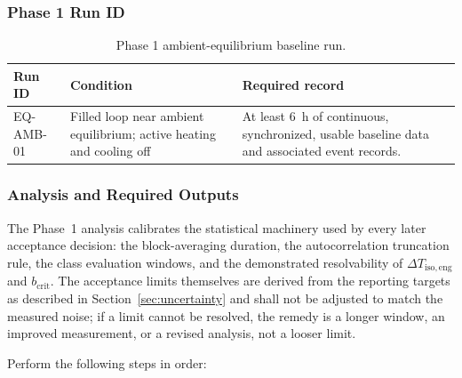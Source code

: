 \documentclass[11pt]{article}
\begin{document}
\subsubsection{Phase 1 Run ID}

\begin{table}[htbp]
    \centering
    \caption{Phase 1 ambient-equilibrium baseline run.}
    \label{tab:phase1_runs}
    \begin{tabularx}{\textwidth}{
        @{}
        >{\raggedright\arraybackslash}p{1.20in}
        >{\raggedright\arraybackslash}p{1.85in}
        >{\raggedright\arraybackslash}X
        @{}
    }
        \toprule
        \textbf{Run ID} &
        \textbf{Condition} &
        \textbf{Required record} \\
        \midrule

        EQ-AMB-01 &
        Filled loop near ambient equilibrium; active heating and cooling off &
        At least \SI{6}{h} of continuous, synchronized, usable baseline data and associated event records. \\

        \bottomrule
    \end{tabularx}
\end{table}

\subsubsection{Analysis and Required Outputs}

The Phase~1 analysis calibrates the statistical machinery used by every later acceptance decision: the block-averaging duration, the autocorrelation truncation rule, the class evaluation windows, and the demonstrated resolvability of $\Delta T_{\mathrm{iso,eng}}$ and $b_{\mathrm{crit}}$. The acceptance limits themselves are derived from the reporting targets as described in Section~\ref{sec:uncertainty} and shall not be adjusted to match the measured noise; if a limit cannot be resolved, the remedy is a longer window, an improved measurement, or a revised analysis, not a looser limit.

Perform the following steps in order:
\end{document}
